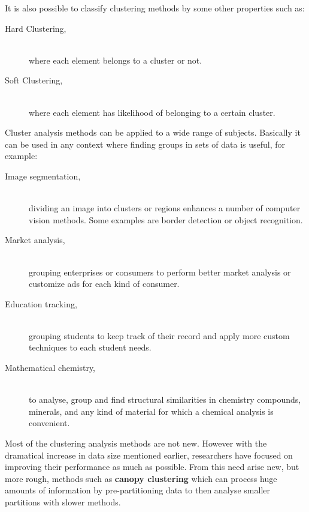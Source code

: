 It is also possible to classify clustering methods by some other properties such as:

\begin{description}
\item [Hard Clustering,] \hfill \\ where each element belongs to a cluster or not.
\item [Soft Clustering,] \hfill \\ where each element has likelihood of belonging to a certain cluster.
\end{description}


Cluster analysis methods can be applied to a wide range of subjects. Basically it can be used in any context where finding groups in sets of data is useful, for example:

\begin{description}
\item [Image segmentation,] \hfill \\ dividing an image into clusters or regions enhances a number of computer vision methods. Some examples are border detection or object recognition. \cite{Ayech2015}
\item [Market analysis,] \hfill \\ grouping enterprises \cite{Burca2014} or consumers \cite{Muller2014} to perform better market analysis or customize ads for each kind of consumer.
\item [Education tracking,] \hfill \\ grouping students to keep track of their record and apply more custom techniques to each student needs. \cite{Chan2014}
\item [Mathematical chemistry,] \hfill \\ to analyse, group and find structural similarities in chemistry compounds, minerals, and any kind of material for which a chemical analysis is convenient. \cite{Cortes2007}
\end{description}


Most of the clustering analysis methods are not new. However with the dramatical increase in data size mentioned earlier, researchers have focused on improving their performance as much as possible. From this need arise new, but more rough, methods such as \textbf{canopy clustering} \cite{Nayak2015} which can process huge amounts of information by pre-partitioning data to then analyse smaller partitions with slower methods.


